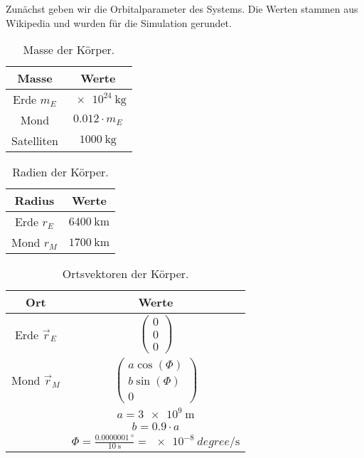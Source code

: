 \documentclass{subfiles}
\begin{document}
    Zunächst geben wir die Orbitalparameter des Systems. Die Werten stammen aus Wikipedia und wurden für die Simulation gerundet.
    \begin{table}[h]
        \centering
        \begin{tabular}[h]{|c|c|}\hline
            Masse & Werte \\\hline\hline
            Erde $m_E$ & $\num{e24}\SI{}{\kilo\gram}$ \\\hline
            Mond & $0.012\cdot m_E$ \\\hline
            Satelliten & $1000\SI{}{\kilo\gram}$ \\\hline
        \end{tabular}
        \caption{Masse der Körper.}
    \end{table}
    \begin{table}[h]
        \centering
        \begin{tabular}[h]{|c|c|}\hline
            Radius & Werte \\\hline\hline
            Erde $r_E$ & $6400\SI{}{\kilo\meter}$ \\\hline
            Mond $r_M$ & $1700\SI{}{\kilo\meter}$ \\\hline
        \end{tabular}
        \caption{Radien der Körper.}
    \end{table}
    \begin{table}[h]
        \centering
        \begin{tabular}[h]{|c|c|}\hline
            Ort & Werte \\\hline\hline
            Erde $\vec{r}_E$ & $\begin{pmatrix}
                0\\0\\0
            \end{pmatrix}$ \\\hline
            Mond $\vec{r}_M$ & $\begin{pmatrix}
                a \cos(\Phi)\\b \sin(\Phi)\\0
            \end{pmatrix}$  \\
            &$a = \num{3e9}\SI{}{\meter}$\\
            &$b = 0.9 \cdot  a$\\
            &$\Phi = \frac{0.0000001\SI{}{\degree}}{10 \SI{}{\second}} = \num{e-8}\SI{}{degree\per\second}$ \\\hline
        \end{tabular}
        \caption{Ortsvektoren der Körper.}
    \end{table}
\end{document}
